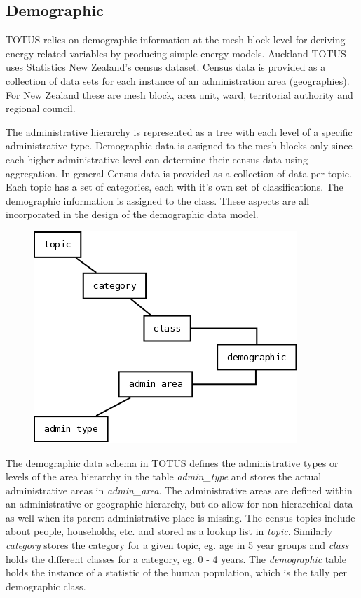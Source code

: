 \subsection{Demographic}
TOTUS relies on demographic information at the mesh block level for
deriving energy related variables by producing simple energy models.
Auckland TOTUS uses Statistics New Zealand's census
dataset. Census data is provided as a collection of data sets for each
instance of an administration area (geographies). For New Zealand these
are mesh block, area unit, ward, territorial authority and regional
council.

The administrative hierarchy is represented as a tree with each level of
a specific administrative type. Demographic data is assigned to the
mesh blocks only since each higher administrative level can determine
their census data using aggregation. In general Census data is provided
as a collection of data per topic. Each topic has a set of categories,
each with it's own set of classifications. The
demographic information is assigned to the class. These aspects are all
incorporated in the design of the demographic data model.

\begin{figure}[h]
 \centering
 \includegraphics[scale=0.4,keepaspectratio=true]{./census.png}
\end{figure}


The demographic data schema in TOTUS defines the administrative types or
levels of the area hierarchy in the table
\textit{admin\_type} and stores the actual administrative
areas in \textit{admin\_area}. The administrative areas are
defined within an administrative or geographic hierarchy, but do allow
for non-hierarchical data as well when its parent administrative place
is missing. The census topics include about people, households, etc.
and stored as a lookup list in \textit{topic}. Similarly
\textit{category} stores the category for a given topic, eg.
age in 5 year groups and \textit{class} holds the different
classes for a category, eg. 0 - 4 years. The
\textit{demographic} table holds the instance of a statistic
of the human population, which is the tally per demographic class.